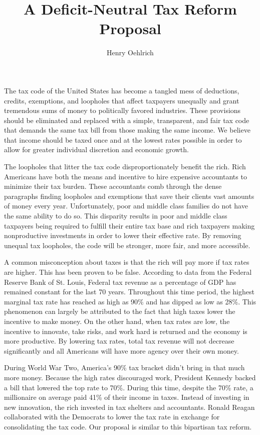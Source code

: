 \documentclass{article}
\title{A Deficit-Neutral Tax Reform Proposal}
\author{Henry Oehlrich}
\begin{document}
\maketitle

The tax code of the United States has become a tangled mess of deductions,
credits, exemptions, and loopholes that affect taxpayers unequally and grant
tremendous sums of money to politically favored industries. These provisions
should be eliminated and replaced with a simple, transparent, and fair tax code
that demands the same tax bill from those making the same income. We believe
that income should be taxed once and at the lowest rates possible in order to
allow for greater individual discretion and economic growth.

The loopholes that litter the tax code disproportionately benefit the rich.
Rich Americans have both the means and incentive to hire expensive accountants
to minimize their tax burden. These accountants comb through the dense
paragraphs finding loopholes and exemptions that save their clients vast
amounts of money every year. Unfortunately, poor and middle class families do
not have the same ability to do so. This disparity results in poor and middle
class taxpayers being required to fulfill their entire tax base and rich
taxpayers making nonproductive investments in order to lower their effective
rate. By removing unequal tax loopholes, the code will be stronger, more fair,
and more accessible.

A common misconception about taxes is that the rich will pay more if tax rates
are higher. This has been proven to be false. According to data from the
Federal Reserve Bank of St. Louis, Federal tax revenue as a percentage of GDP
has remained constant for the last 70 years. Throughout this time period, the
highest marginal tax rate has reached as high as 90\% and has dipped as low as
28\%. This phenomenon can largely be attributed to the fact that high taxes
lower the incentive to make money. On the other hand, when tax rates are low,
the incentive to innovate, take risks, and work hard is returned and the
economy is more productive. By lowering tax rates, total tax revenue will not
decrease significantly and all Americans will have more agency over their own
money.

During World War Two, America's 90\% tax bracket didn't bring in that much more
money. Because the high rates discouraged work, President Kennedy backed a bill
that lowered the top rate to 70\%. During this time, despite the 70\% rate, a
millionaire on average paid 41\% of their income in taxes. Instead of investing
in new innovation, the rich invested in tax shelters and accountants. Ronald
Reagan collaborated with the Democrats to lower the tax rate in exchange for
consolidating the tax code. Our proposal is similar to this bipartisan tax
reform.
\end{document}
